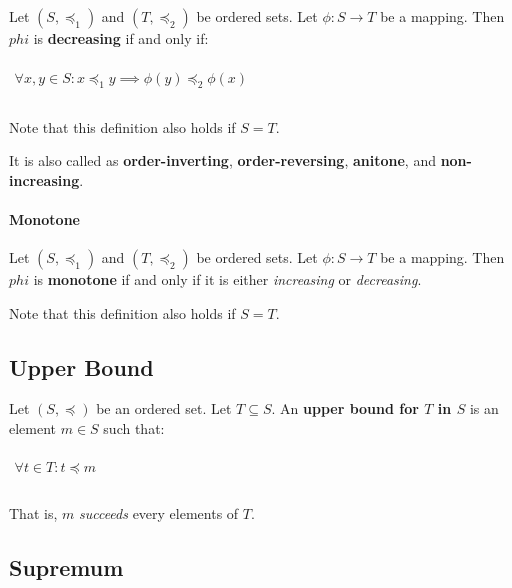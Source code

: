 Let $(S, \preceq_1)$ and $(T, \preceq_2)$ be ordered sets. Let
$\phi: S \to T$ be a mapping. Then $phi$ is \textbf{decreasing} if and
only if:

\begin{math}
  \begin{array}{c}
    \\
    \forall x, y \in S: x \preceq_1 y \implies \phi(y) \preceq_2 \phi(x) \\
    \\
  \end{array}
\end{math}

Note that this definition also holds if $S = T$.

It is also called as \textbf{order-inverting},
\textbf{order-reversing}, \textbf{anitone}, and
\textbf{non-increasing}.


\paragraph{Monotone}
\label{sec:monotone}


Let $(S, \preceq_1)$ and $(T, \preceq_2)$ be ordered sets. Let
$\phi: S \to T$ be a mapping. Then $phi$ is \textbf{monotone} if and
only if it is either \textit{increasing} or \textit{decreasing}.

Note that this definition also holds if $S = T$.




\subsection{Upper Bound}
\label{sec:upper-bound}

Let $(S, \preceq)$ be an ordered set. Let $T \subseteq S$. An
\textbf{upper bound for $T$ in $S$} is an element $m \in S$ such that:

\begin{math}
  \begin{array}{c}
    \\
    \forall t \in T : t \preceq m\\
    \\
  \end{array}
\end{math}

That is, $m$ \textit{succeeds} every elements of $T$.



\subsection{Supremum}
\label{sec:supremum}

